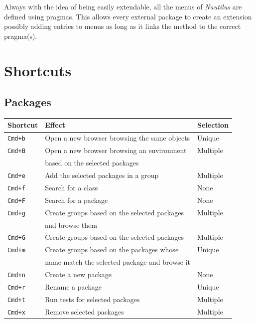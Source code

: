 \documentclass[a4paper,10pt,twoside]{book}
\newcommand\nautilus{\emph{Nautilus}\xspace}
\begin{document}
Always with the idea of being easily extendable, all the menus of \nautilus are defined using pragmas. This allows every external package to create an extension possibly adding entries to menus as long as it links the method to the correct pragma(s).

\section{Shortcuts}\label{sec:shortcuts}
\subsection{Packages}


\begin{tabular}{l | l | l}
Shortcut & Effect & Selection\\
\hline
\hline
\verb?Cmd+b? & Open a new browser browsing the same objects & Unique\\
\hline
\verb?Cmd+B?& Open a new browser browsing an environment & Multiple\\
 &based on the selected packages & \\
\hline
\verb?Cmd+e? & Add the selected packages in a group& Multiple\\
\hline
\verb?Cmd+f? &  Search for a class& None\\
\hline
\verb?Cmd+F? & Search for a package& None\\
\hline
\verb?Cmd+g? & Create groups based on the selected packages & Multiple\\
&and browse them&\\
\hline
\verb?Cmd+G? & Create groups based on the selected packages&Multiple\\
\hline
\verb?Cmd+m? & Create groups based on the packages whose & Unique\\
        & name match the selected package and browse it &  \\
\hline
\verb?Cmd+n? & Create a new package&None\\
\hline
\verb?Cmd+r? & Rename a package&Unique\\
\hline
\verb?Cmd+t? & Run tests for selected packages&Multiple\\
\hline
\verb?Cmd+x? & Remove selected packages&Multiple\\
\hline
\end{tabular}
\end{document}
